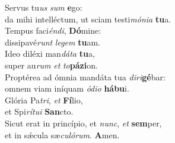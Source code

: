 \oddverse Servus tu\textit{us} \textit{sum} \textbf{e}go:~\*\\
\oddverse da mihi intelléctum, ut sciam testi\textit{mó}\textit{ni}\textit{a} \textbf{tu}a.\\
\evenverse Tempus faci\textit{én}\textit{di}, \textbf{Dó}mine:~\*\\
\evenverse dissipavé\textit{runt} \textit{le}\textit{gem} \textbf{tu}am.\\
\oddverse Ideo diléxi man\textit{dá}\textit{ta} \textbf{tu}a,~\*\\
\oddverse super au\textit{rum} \textit{et} \textit{to}\textbf{pá}\textbf{zi}on.\\
\evenverse Proptérea ad ómnia mandáta tua \textit{di}\textit{ri}\textbf{gé}bar:~\*\\
\evenverse omnem viam iníquam \textit{ó}\textit{di}\textit{o} \textbf{há}\textbf{bu}i.\\
\oddverse Glória Pa\textit{tri}, \textit{et} \textbf{Fí}lio,~\*\\
\oddverse et Spi\textit{rí}\textit{tu}\textit{i} \textbf{San}cto.\\
\evenverse Sicut erat in princípio, et \textit{nunc}, \textit{et} \textbf{sem}per,~\*\\
\evenverse et in sǽcula sæ\textit{cu}\textit{ló}\textit{rum}. \textbf{A}men.\\
